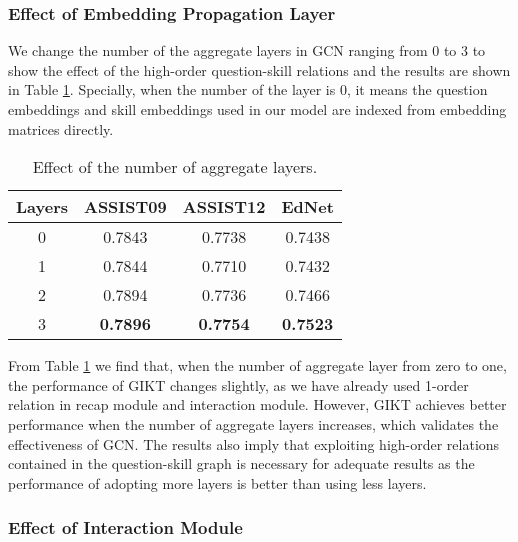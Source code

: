 \documentclass[runningheads]{llncs}
\begin{document}
\subsubsection{Effect of Embedding Propagation Layer}	
We change the number of the aggregate layers in GCN ranging from 0 to 3 to show the effect of the high-order question-skill relations and the results are shown in Table \ref{tab:layers}. Specially, when the number of the layer is 0, it means the question embeddings and skill embeddings used in our model are indexed from embedding matrices directly. 







\begin{table}
	\centering
	\caption{Effect of the number of aggregate layers.}
\begin{tabular}{cccc}
		\hline
		Layers & ASSIST09 & ASSIST12 & EdNet  \\
		\hline
		
		\hline
		0 & 0.7843 & 0.7738 & 0.7438    \\
		1 & 0.7844 & 0.7710 & 0.7432   \\
		2 & 0.7894 & 0.7736 & 0.7466  \\
		3 & \textbf{0.7896} & \textbf{0.7754} & \textbf{0.7523}  \\
		
		
		\hline
	\end{tabular}
	\label{tab:layers}
\end{table}

From Table \ref{tab:layers} we find that, when the number of aggregate layer from zero to one, the performance of GIKT changes slightly, as we have already used 1-order relation in recap module and interaction module. However, GIKT achieves better performance when the number of aggregate layers increases, which validates the effectiveness of GCN. The results also imply that exploiting high-order relations contained in the question-skill graph is necessary for adequate results as the performance of adopting more layers is better than using less layers.

\subsubsection{Effect of Interaction Module}
\end{document}
